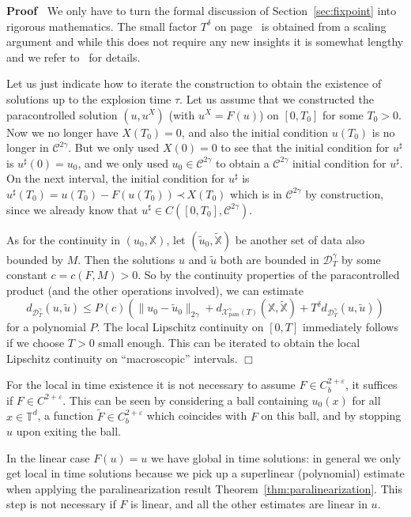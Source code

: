 \documentclass[a4paper,11pt]{article}
\newcommand{\tmop}[1]{\ensuremath{\operatorname{#1}}}
\newenvironment{proof}{\noindent\textbf{Proof\ }}{\hspace*{\fill}$\Box$\medskip}
\newcommand{\CC}{\mathscr{C}}
\newcommand{\CD}{\mathscr{D}}
\newcommand{\lpara}{\,\mathord{\prec}\,}
\begin{document}
\begin{proof}
  We only have to turn the formal discussion of Section~\ref{sec:fixpoint}
  into rigorous mathematics. The small factor $T^{\delta}$ on page~\pageref{page:scaling factor} is obtained from a
  scaling argument and while this does not require any new insights it is
  somewhat lengthy and we refer to~{\cite{Gubinelli2012,Gubinelli2014}} for
  details.
  
  Let us just indicate how to iterate the construction to obtain the existence
  of solutions up to the explosion time $\tau$. Let us assume that we
  constructed the paracontrolled solution $(u, u^X)$ (with $u^X = F(u)$) on $[0, T_0]$ for some $T_0 > 0$. Now we no longer have $X
  (T_0) = 0$, and also the initial condition $u (T_0)$ is no longer in $\CC^{2
  \gamma}$. But we only used $X (0) = 0$ to see that the initial condition for $u^{\sharp}$ is $u^\sharp(0) = u_0$, and we only used $u_0 \in \CC^{2\gamma}$ to obtain a $\CC^{2 \gamma}$ initial condition for $u^{\sharp}$. On the next interval, the initial condition for $u^\sharp$ is $u^\sharp(T_0) = u(T_0) - F(u(T_0)) \lpara X(T_0)$ which is in $\CC^{2\gamma}$ by construction, since we already know that $u^\sharp \in C([0,T_0], \CC^{2\gamma})$.
  
  As for the continuity in $(u_0, \mathbb{X})$, let $(\tilde{u}_0,
  \tilde{\mathbb{X}})$ be another set of data also bounded by $M$. Then the
  solutions $u$ and $\tilde{u}$ both are bounded in $\CD^{\gamma}_T$ by some
  constant $c = c (F, M) > 0$. So by the continuity properties of the
  paracontrolled product (and the other operations involved), we can estimate
  \[ d_{\CD^{\gamma}_T} (u, \tilde{u}) \leqslant P (c) \left( \| u_0 -
     \tilde{u}_0 \|_{2 \gamma} + d_{\mathcal{X}_{\tmop{pam}}^\gamma (T)}
     (\mathbb{X}, \tilde{\mathbb{X}}) + T^{\delta} d_{\CD^{\gamma}_T} (u,
     \tilde{u}) \right) \]
  for a polynomial $P$. The local Lipschitz continuity on $[0, T]$ immediately
  follows if we choose $T > 0$ small enough. This can be iterated to obtain
  the local Lipschitz continuity on ``macroscopic'' intervals. 
\end{proof}

\begin{remark}
  For the local in time existence it is not necessary to assume $F \in C^{2 +
  \varepsilon}_b$, it suffices if $F \in C^{2 + \varepsilon}$. This can be
  seen by considering a ball containing $u_0 (x)$ for all $x \in
  \mathbb{T}^d$, a function $\tilde{F} \in C^{2 + \varepsilon}_b$ which
  coincides with $F$ on this ball, and by stopping $u$ upon exiting the ball.
  
  In the linear case $F (u) = u$ we have global in time solutions: in general
  we only get local in time solutions because we pick up a superlinear (polynomial)
  estimate when applying the paralinearization result
  Theorem~\ref{thm:paralinearization}. This step is not necessary if $F$ is
  linear, and all the other estimates are linear in $u$. 
\end{remark}
\end{document}
